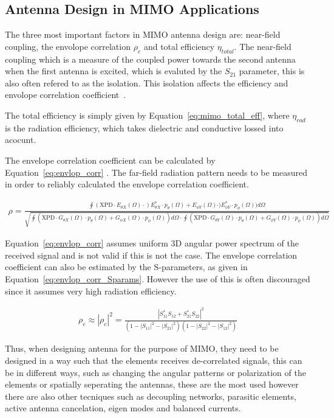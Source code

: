 \subsection{Antenna Design in MIMO Applications}
The three most important factors in MIMO antenna design are: near-field coupling, the envolope correlation $\rho_e$ and total efficiency $\eta_{total}$. The near-field coupling which is a measure of the coupled power towards the second antenna when the first antenna is excited, which is evaluted by the $S_{21}$ parameter, this is also often refered to as the isolation. This isolation affects the efficiency and envolope correlation coefficient~\cite{Tatomirescu2011PortIsolation}. 

The total efficiency is simply given by Equation~\ref{eq:mimo_total_eff}\cite{Tatomirescu2011PortIsolation}, where $\eta_{rad}$ is the radiation efficiency, which takes dielectric and conductive lossed into acocunt. 

The envelope correlation coefficient can be calculated by Equation~\ref{eq:envlop_corr} \cite{Tatomirescu2011PortIsolation}. The far-field radiation pattern needs to be measured in order to reliably calculated the envelope correlation coefficient.

\begin{align} 
\label{eq:envlop_corr}
\rho = \frac{\oint(\text{XPD} \cdot E_{\theta X}(\Omega) \cdot) E^*_{\theta X} \cdot p_\theta(\Omega)+E_{\phi Y}(\Omega) \cdot) E^*_{\phi Y} \cdot p_\phi(\Omega) )d\Omega}{\sqrt{\oint(\text{XPD}\cdot G_{\theta X}(\Omega) \cdot p_\theta(\Omega)+G_{\phi X}(\Omega) \cdot p_\phi(\Omega))d\Omega \cdot \oint(\text{XPD}\cdot G_{\theta Y}(\Omega) \cdot p_\theta(\Omega)+G_{\phi Y}(\Omega) \cdot p_\phi(\Omega))d\Omega }}
\end{align}

Equation~\ref{eq:envlop_corr} assumes uniform 3D angular power spectrum of the received signal and is not valid if this is not the case. The envelope correlation coefficient can also be estimated by the S-parameters, as given in Equation~\ref{eq:envlop_corr_Sparams}\cite{Alain2010MIMO}. However the use of this is often discouraged since it assumes very high radiation efficiency. 

\begin{align}
\label{eq:envlop_corr_Sparams}
  \rho_e \approx |\rho_c|^2 = \frac{|S^*_{11}S_{12}+S^*_{21}S_{22}|^2}{(1-|S_{11}|^2-|S_{21}|^2)(1-|S_{22}|^2-|S_{12}|^2)}
\end{align}

Thus, when designing antenna for the purpose of MIMO, they need to be designed in a way such that the elements receives de-correlated signals, this can be in different ways, such as changing the angular patterns or polarization of the elements or spatially seperating the antennas, these are the most used however there are also other tecniques such as decoupling networks, parasitic elements, active antenna cancelation, eigen modes and balanced currents. 

